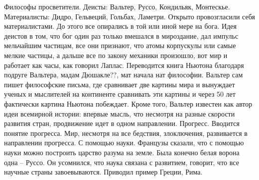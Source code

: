 \documentclass[a4paper, 12pt]{article}
\begin{document}
Философы просветители. Деисты: Вальтер, Руссо, Кондильяк, Монтескье. 
Материалисты: Дидро, Гельвеций, Гольбах, Ламетри. Открыто провозгласили 
себя материалистами. До этого все опирались в той или иной мере на бога. 
Идея деистов в том, что бог один раз только вмешался в мироздание, дал 
импульс мельчайшим частицам, все они признают, что атомы корпускулы или 
самые мелкие частицы, а дальше все по закону механики произошло, вот мир 
и работает как часы, как говорил Лаплас. Переводится книга Ньютона 
благодаря подруге Вальтера, мадам Дюшакле??, мат начала нат философии. 
Вальтер сам пишет философские письма, где сравнивает две картины мира 
и вынуждает ученых и мыслителей на континенте сравнивать эти картины 
и через 50 лет фактически картина Ньютона побеждает. Кроме того, Вальтер 
известен как автор идеи всемирной истории: впервые мысль, что несмотря 
на разные скорости развития стран, продвижение идет в одном направлении. 
Прогресс. Вводится понятие прогресса. Мир, несмотря на все бедствия, 
злоключения, развивается в направлении прогресса. С помощью науки. 
Французы сказали, что с помощью науки можно построить царство разума на 
земле. Была конечно белая ворона одна -- Руссо. Он усомнился, что наука 
связана с развитием, говорит, что все научные страны завоевываются. 
Приводил пример Греции, Рима.
\end{document}
